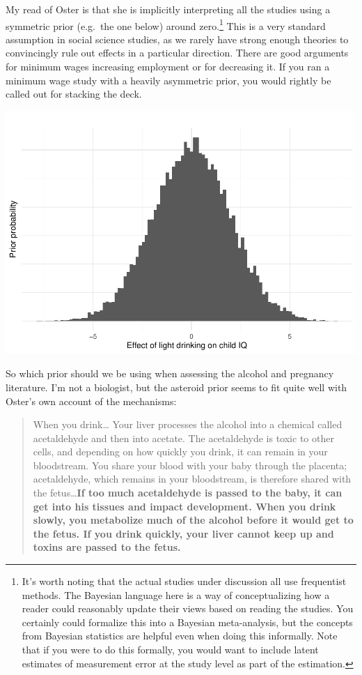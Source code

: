 \documentclass[
]{article}
\begin{document}
My read of Oster is that she is implicitly interpreting all the studies using a symmetric prior (e.g.~the one below) around zero.\footnote{It's worth noting that the actual studies under discussion all use frequentist methods. The Bayesian language here is a way of conceptualizing how a reader could reasonably update their views based on reading the studies. You certainly could formalize this into a Bayesian meta-analysis, but the concepts from Bayesian statistics are helpful even when doing this informally. Note that if you were to do this formally, you would want to include latent estimates of measurement error at the study level as part of the estimation.} This is a very standard assumption in social science studies, as we rarely have strong enough theories to convincingly rule out effects in a particular direction. There are good arguments for minimum wages increasing employment or for decreasing it. If you ran a minimum wage study with a heavily asymmetric prior, you would rightly be called out for stacking the deck.

\includegraphics{index_files/figure-latex/unnamed-chunk-2-1.pdf}

So which prior should we be using when assessing the alcohol and pregnancy literature. I'm not a biologist, but the asteroid prior seems to fit quite well with Oster's own account of the mechanisms:

\begin{quote}
When you drink\ldots{} Your liver processes the alcohol into a chemical called acetaldehyde and then into acetate. The acetaldehyde is toxic to other cells, and depending on how quickly you drink, it can remain in your bloodstream. You share your blood with your baby through the placenta; acetaldehyde, which remains in your bloodstream, is therefore shared with the fetus\ldots{}\textbf{If too much acetaldehyde is passed to the baby, it can get into his tissues and impact development. When you drink slowly, you metabolize much of the alcohol before it would get to the fetus. If you drink quickly, your liver cannot keep up and toxins are passed to the fetus.}
\end{quote}
\end{document}
